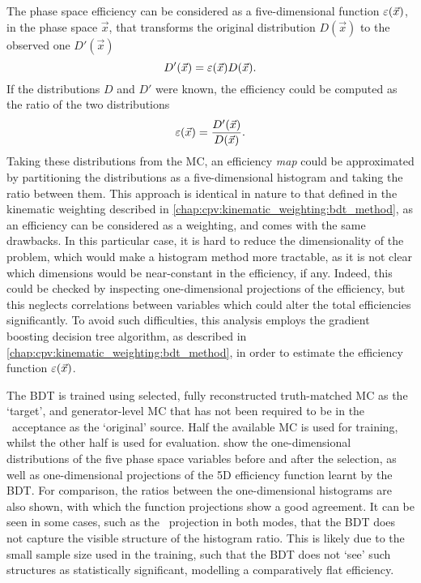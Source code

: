 The phase space efficiency can be considered as a five-dimensional function 
$\varepsilon(\vec{x})$, in the phase space $\vec{x}$, that transforms the original 
distribution $D(\vec{x})$ to the observed one $D'(\vec{x})$
\begin{equation}
  D'(\vec{x}) = \varepsilon(\vec{x})D(\vec{x}).
\end{equation}
If the distributions $D$ and $D'$ were known, the efficiency could be computed 
as the ratio of the two distributions
\begin{equation}
  \varepsilon(\vec{x}) = \frac{D'(\vec{x})}{D(\vec{x})}.
\end{equation}
Taking these distributions from the \ac{MC}, an efficiency \emph{map} could be 
approximated by partitioning the distributions as a five-dimensional histogram 
and taking the ratio between them.
This approach is identical in nature to that defined in the kinematic weighting 
described in \cref{chap:cpv:kinematic_weighting:bdt_method}, as an efficiency 
can be considered as a weighting, and comes with the same drawbacks.
In this particular case, it is hard to reduce the dimensionality of the 
problem, which would make a histogram method more tractable, as it is not clear 
which dimensions would be near-constant in the efficiency, if any.
Indeed, this could be checked by inspecting one-dimensional projections of the 
efficiency, but this neglects correlations between variables which could alter 
the total efficiencies significantly.
To avoid such difficulties, this analysis employs the gradient boosting 
decision tree algorithm, as described in 
\cref{chap:cpv:kinematic_weighting:bdt_method}, in order to estimate the 
efficiency function $\varepsilon(\vec{x})$.

The \ac{BDT} is trained using selected, fully reconstructed truth-matched 
\ac{MC} as the `target', and generator-level \ac{MC} that has not been required 
to be in the \lhcb\ acceptance as the `original' source.
Half the available \ac{MC} is used for training, whilst the other half is used 
for evaluation.
 show the one-dimensional 
distributions of the five phase space variables before and after the selection, 
as well as one-dimensional projections of the 5D efficiency function learnt by 
the \ac{BDT}.
For comparison, the ratios between the one-dimensional histograms are also 
shown, with which the function projections show a good agreement.
It can be seen in some cases, such as the \phihh\ projection in both modes, 
that the \ac{BDT} does not capture the visible structure of the histogram 
ratio.
This is likely due to the small sample size used in the training, such that the 
\ac{BDT} does not `see' such structures as statistically significant, modelling 
a comparatively flat efficiency.

